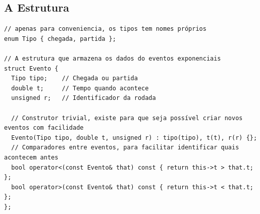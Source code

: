\documentclass{article}
\begin{document}
\subsection{A Estrutura}
\begin{verbatim}
// apenas para conveniencia, os tipos tem nomes próprios
enum Tipo { chegada, partida };

// A estrutura que armazena os dados do eventos exponenciais
struct Evento {
  Tipo tipo;    // Chegada ou partida
  double t;     // Tempo quando acontece
  unsigned r;   // Identificador da rodada

  // Construtor trivial, existe para que seja possível criar novos eventos com facilidade
  Evento(Tipo tipo, double t, unsigned r) : tipo(tipo), t(t), r(r) {};
  // Comparadores entre eventos, para facilitar identificar quais acontecem antes
  bool operator<(const Evento& that) const { return this->t > that.t; };
  bool operator>(const Evento& that) const { return this->t < that.t; };
};
\end{verbatim}
\end{document}
